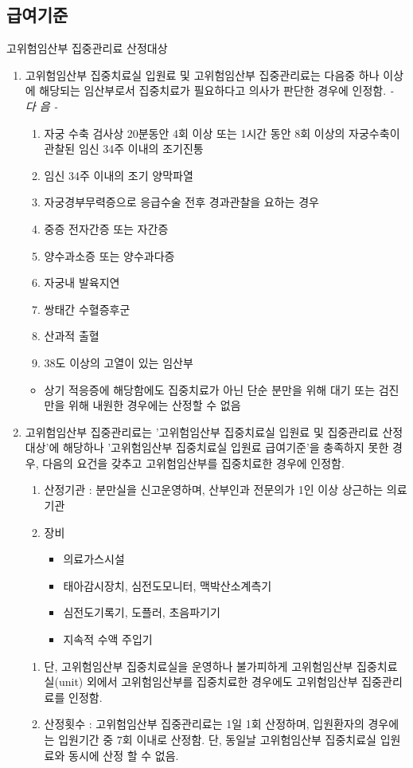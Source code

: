 \subsection{급여기준}
고위험임산부 집중관리료 산정대상
\begin{enumerate}[1)]\tightlist
\item 고위험임산부 집중치료실 입원료 및 고위험임산부 집중관리료는 다음중 하나 이상에 해당되는 임산부로서 집중치료가 필요하다고 의사가 판단한 경우에 인정함.\newline
\emph{ - 다 음 - }
	\begin{enumerate}[가.]\tightlist
	\item 자궁 수축 검사상 20분동안 4회 이상 또는 1시간 동안 8회 이상의 자궁수축이 관찰된 임신 34주 이내의 조기진통
	\item 임신 34주 이내의 조기 양막파열
	\item 자궁경부무력증으로 응급수술 전\cntrdot{}후 경과관찰을 요하는 경우
	\item 중증 전자간증 또는 자간증
	\item 양수과소증 또는 양수과다증
	\item 자궁내 발육지연
	\item 쌍태간 수혈증후군
	\item 산과적 출혈
	\item 38도 이상의 고열이 있는 임산부
	\end{enumerate}
	\begin{itemize}[*]\tightlist
	\item 상기 적응증에 해당함에도 집중치료가 아닌 단순 분만을 위해 대기 또는 검진만을 위해 내원한 경우에는 산정할 수 없음
	\end{itemize}
\item 고위험임산부 집중관리료는 '고위험임산부 집중치료실 입원료 및 집중관리료 산정대상'에 해당하나 '고위험임산부 집중치료실 입원료 급여기준'을 충족하지 못한 경우, 다음의 요건을 갖추고 고위험임산부를 집중치료한 경우에 인정함.
	\begin{enumerate}[가.]\tightlist
	\item 산정기관 : 분만실을 신고\cntrdot{}운영하며, 산부인과 전문의가 1인 이상 상근하는 의료기관
	\item 장비
		\begin{itemize}[-]\tightlist
		\item 의료가스시설
		\item 태아감시장치, 심전도모니터, 맥박산소계측기
		\item 심전도기록기, 도플러, 초음파기기
		\item 지속적 수액 주입기
		\end{itemize}
	\end{enumerate}
	\begin{enumerate}[1.]\tightlist
	\item 단, 고위험임산부 집중치료실을 운영하나 불가피하게 고위험임산부 집중치료실(unit) 외에서 고위험임산부를 집중치료한 경우에도 고위험임산부 집중관리료를 인정함.
	\item 산정횟수 : 고위험임산부 집중관리료는 1일 1회 산정하며, 입원환자의 경우에는 입원기간 중 7회 이내로 산정함. 단, 동일날 고위험임산부 집중치료실 입원료와 동시에 산정 할 수 없음.
	\end{enumerate}	
\end{enumerate}	